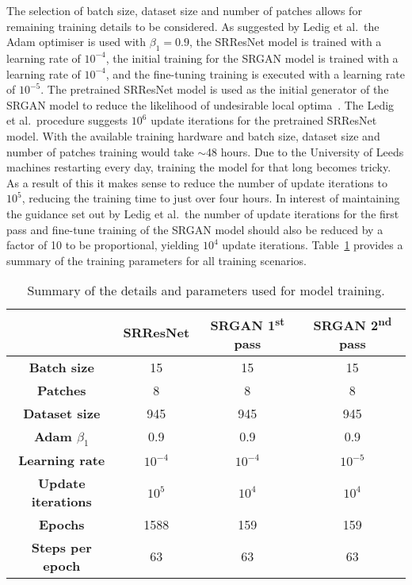 The selection of batch size, dataset size and number of patches allows for remaining training details to be considered. As suggested by Ledig et al.\ the Adam optimiser is used with $\beta_1 = 0.9$, the SRResNet model is trained with a learning rate of $10^{-4}$, the initial training for the SRGAN model is trained with a learning rate of $10^{-4}$, and the fine-tuning training is executed with a learning rate of $10^{-5}$. The pretrained SRResNet model is used as the initial generator of the SRGAN model to reduce the likelihood of undesirable local optima~\cite{srgan}. The Ledig et al.\ procedure suggests $10^6$ update iterations for the pretrained SRResNet model. With the available training hardware and batch size, dataset size and number of patches training would take $\sim$48 hours. Due to the University of Leeds machines restarting every day, training the model for that long becomes tricky. As a result of this it makes sense to reduce the number of update iterations to $10^{5}$, reducing the training time to just over four hours. In interest of maintaining the guidance set out by Ledig et al.\ the number of update iterations for the first pass and fine-tune training of the SRGAN model should also be reduced by a factor of 10 to be proportional, yielding $10^4$ update iterations. Table~\ref{table:model_training} provides a summary of the training parameters for all training scenarios.
\begin{table}
    \centering
    \begin{tabular}{cccc}
        \toprule
        {} & \textbf{SRResNet} & \textbf{SRGAN 1\textsuperscript{st} pass} & \textbf{SRGAN 2\textsuperscript{nd} pass} \\
        \midrule
        \textbf{Batch size} & 15 & 15 & 15\\ 
        \textbf{Patches} & 8 & 8 & 8 \\
        \textbf{Dataset size} & 945 & 945 & 945\\
        \textbf{Adam $\beta_1$} & 0.9 & 0.9 & 0.9\\
        \textbf{Learning rate} & $10^{-4}$ & $10^{-4}$ & $10^{-5}$ \\
        \textbf{Update iterations} & $10^5$ & $10^4$ & $10^4$ \\
        \textbf{Epochs} & 1588 & 159 & 159 \\
        \textbf{Steps per epoch} & 63 & 63 & 63 \\
        \bottomrule
    \end{tabular}
    \caption{Summary of the details and parameters used for model training.}
    \label{table:model_training}
\end{table}

